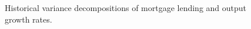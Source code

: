 \documentclass[12pt]{article}
\numberwithin{equation}{section}
\begin{document}
\begin{figure}[H]
\centering
\caption{Historical variance decompositions of mortgage lending and output growth rates.}
\label{decomp_dbm}
\end{figure}










\end{document}
